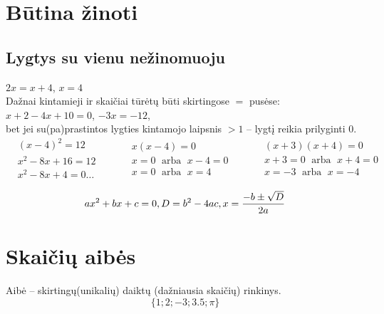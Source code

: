\documentclass[fleqn]{article} %
\DeclareMathOperator{\arba}{\ arba\ }
\begin{document}

\renewcommand{\tablename}{Lentelė}
\renewcommand{\figurename}{Iliustracija}
\renewcommand{\vec}{\vv}
\pagestyle{plain}
\texttt{}


\section{Būtina žinoti}

\subsection{Lygtys su vienu nežinomuoju}
$2x = x + 4$, $x = 4$ \\
Dažnai kintamieji ir skaičiai tūrėtų būti skirtingose $=$ pusėse:
$x + 2 - 4x + 10 = 0$, $-3x = -12$, \\
bet jei su(pa)prastintos lygties kintamojo laipsnis $ > 1$ -- lygtį reikia prilyginti $0$.
\begin{equation}    
\begin{aligned}
    & (x - 4)^2 = 12 \\
    & x^2 - 8x + 16 = 12 \\
    & x^2 - 8x + 4 = 0 \dots
\end{aligned}
\qquad
\begin{aligned}
    & x(x - 4) = 0 \\
    & x = 0\arba x - 4 = 0 \\
    & x = 0\arba x = 4    
\end{aligned}
\qquad
\begin{aligned}    
    & (x + 3)(x + 4) = 0 \\
    & x + 3 = 0\arba x + 4 = 0 \\
    & x = -3\arba x = -4
\end{aligned}
\end{equation}

\begin{equation}
    ax^2 + bx + c = 0, \\
    D = b^2 - 4ac,     \\
    x = \frac{-b \pm \sqrt{D}}{2a}
\end{equation}


\section{Skaičių aibės}
Aibė -- skirtingų(unikalių) daiktų (dažniausia skaičių) rinkinys.
\begin{equation}
\{1; 2; -3; 3.5; \pi\}
\end{equation}
\end{document}
